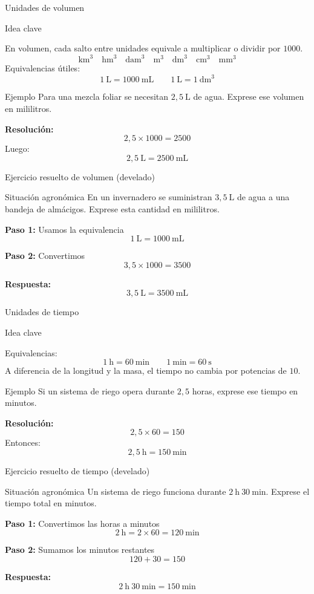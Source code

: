 \documentclass[handout,aspectratio=169,10pt]{beamer}
\newcommand{\idea}[1]{
	\begin{block}{Idea clave}
		#1
	\end{block}
}
\newcommand{\ejemplo}[2]{
	\begin{exampleblock}{Ejemplo}
		#1
		
		\vspace{0.5em}
		\textbf{Resolución:} #2
	\end{exampleblock}
}
\begin{document}
	\begin{frame}{Unidades de volumen}
		\idea{
			En volumen, cada salto entre unidades equivale a multiplicar o dividir por \(1000\).
			\[
			\text{km}^3 \quad \text{hm}^3 \quad \text{dam}^3 \quad \text{m}^3 \quad \text{dm}^3 \quad \text{cm}^3 \quad \text{mm}^3
			\]
			Equivalencias útiles:
			\[
			1\ \text{L} = 1000\ \text{mL}
			\qquad
			1\ \text{L} = 1\ \text{dm}^3
			\]
		}
		
		\pause
		\ejemplo
		{Para una mezcla foliar se necesitan \(2{,}5\ \text{L}\) de agua. Exprese ese volumen en mililitros.}
		{
			\[
			2{,}5 \times 1000 = 2500
			\]
			Luego:
			\[
			2{,}5\ \text{L} = \boxed{2500\ \text{mL}}
			\]
		}
	\end{frame}
	
	\begin{frame}{Ejercicio resuelto de volumen (develado)}
		\begin{block}{Situación agronómica}
			En un invernadero se suministran \(3{,}5\ \text{L}\) de agua a una bandeja de almácigos.  
			Exprese esta cantidad en mililitros.
		\end{block}
		
		\pause
		\textbf{Paso 1:} Usamos la equivalencia
		\[
		1\ \text{L} = 1000\ \text{mL}
		\]
		
		\pause
		\textbf{Paso 2:} Convertimos
		\[
		3{,}5 \times 1000 = 3500
		\]
		
		\pause
		\textbf{Respuesta:}
		\[
		3{,}5\ \text{L} = \boxed{3500\ \text{mL}}
		\]
	\end{frame}
	
	\begin{frame}{Unidades de tiempo}
		\idea{
			Equivalencias:
			\[
			1\ \text{h} = 60\ \text{min}
			\qquad
			1\ \text{min} = 60\ \text{s}
			\]
			A diferencia de la longitud y la masa, el tiempo no cambia por potencias de \(10\).
		}
		
		\pause
		\ejemplo
		{Si un sistema de riego opera durante \(2{,}5\) horas, exprese ese tiempo en minutos.}
		{
			\[
			2{,}5 \times 60 = 150
			\]
			Entonces:
			\[
			2{,}5\ \text{h} = \boxed{150\ \text{min}}
			\]
		}
	\end{frame}
	
	\begin{frame}{Ejercicio resuelto de tiempo (develado)}
		\begin{block}{Situación agronómica}
			Un sistema de riego funciona durante \(2\ \text{h}\ 30\ \text{min}\).  
			Exprese el tiempo total en minutos.
		\end{block}
		
		\pause
		\textbf{Paso 1:} Convertimos las horas a minutos
		\[
		2\ \text{h} = 2 \times 60 = 120\ \text{min}
		\]
		
		\pause
		\textbf{Paso 2:} Sumamos los minutos restantes
		\[
		120 + 30 = 150
		\]
		
		\pause
		\textbf{Respuesta:}
		\[
		2\ \text{h}\ 30\ \text{min} = \boxed{150\ \text{min}}
		\]
	\end{frame}
	
\end{document}
